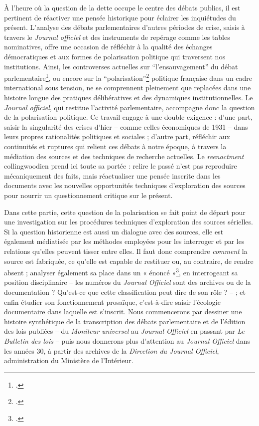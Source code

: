 À l’heure où la question de la dette occupe le centre des débats publics, il est pertinent de réactiver une pensée historique pour éclairer les inquiétudes du présent. L’analyse des débats parlementaires d’autres périodes de crise, saisis à travers le \emph{Journal officiel} et des instruments de repérage comme les tables nominatives, offre une occasion de réfléchir à la qualité des échanges démocratiques et aux formes de polarisation politique qui traversent nos institutions. Ainsi, les controverses actuelles sur \enquote{l’ensauvagement} du débat parlementaire\footcite[][]{ensauvagement}, ou encore sur la \enquote{polarisation}\footcite[][]{polarisation} politique française dans un cadre international sous tension, ne se comprennent pleinement que replacées dans une histoire longue des pratiques délibératives et des dynamiques institutionnelles. Le \emph{Journal officiel}, qui restitue l'activité parlementaire, accompagne donc la question de la polarisation politique. Ce travail engage à une double exigence : d’une part, saisir la singularité des crises d’hier -- comme celles économiques de 1931 -- dans leurs propres rationalités politiques et sociales ; d’autre part, réfléchir aux continuités et ruptures qui relient ces débats à notre époque, à travers la médiation des sources et des techniques de recherche actuelles. Le \emph{reenactment} collingwoodien prend ici toute sa portée : relire le passé n’est pas reproduire mécaniquement des faits, mais réactualiser une pensée inscrite dans les documents avec les nouvelles opportunités techniques d'exploration des sources pour nourrir un questionnement critique sur le présent.

Dans cette partie, cette question de la polarisation se fait point de départ pour une investigation sur les procédures techniques d’exploration des sources sérielles. Si la question historienne est aussi un dialogue avec des sources, elle est également médiatisée par les méthodes employées pour les interroger et par les relations qu’elles peuvent tisser entre elles. Il faut donc comprendre \emph{comment} la source est fabriquée, ce qu’elle est capable de restituer ou, au contraire, de rendre absent ; analyser également sa place dans un « énoncé »\footcite[][]{foucault}, en interrogeant sa position disciplinaire -- les numéros du \emph{Journal Officiel} sont des archives ou de la documentation ? Qu'est-ce que cette classification peut dire de son rôle ? -- ; et enfin étudier son fonctionnement prosaïque, c’est-à-dire saisir l’écologie documentaire dans laquelle est s'inscrit. Nous commencerons par dessiner une histoire synthétique de la transcription des débats parlementaire et de l'édition des lois publiées -- du \emph{Moniteur universel} au \emph{Journal Officiel} en passant par \emph{Le Bulletin des lois} -- puis nous donnerons plus d'attention au \emph{Journal Officiel} dans les années 30, à partir des archives de la \emph{Direction du Journal Officiel}, administration du Ministère de l'Intérieur.

